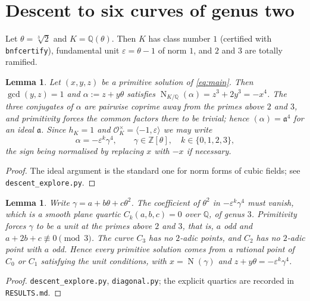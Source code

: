 \documentclass[11pt,reqno]{amsart}
\theoremstyle{plain}
\newtheorem{lemma}[theorem]{Lemma}
\theoremstyle{definition}
\newcommand{\Q}{\mathbb{Q}}
\newcommand{\Z}{\mathbb{Z}}
\newcommand{\Ocal}{\mathcal{O}}
\newcommand{\aaa}{\mathfrak{a}}
\DeclareMathOperator{\Nm}{N}
\numberwithin{equation}{section}
\begin{document}
\section{Descent to six curves of genus two}\label{sec:descent}

Let $\theta=\sqrt[3]{2}$ and $K=\Q(\theta)$. Then $K$ has class number $1$
(certified with \texttt{bnfcertify}), fundamental unit $\varepsilon=\theta-1$ of
norm $1$, and $2$ and $3$ are totally ramified.

\begin{lemma}\label{lem:A1}
Let $(x,y,z)$ be a primitive solution of \eqref{eq:main}. Then $\gcd(y,z)=1$ and
$\alpha:=z+y\theta$ satisfies $\Nm_{K/\Q}(\alpha)=z^{3}+2y^{3}=-x^{4}$. The
three conjugates of $\alpha$ are pairwise coprime away from the primes above
$2$ and $3$, and primitivity forces the common factors there to be trivial;
hence $(\alpha)=\aaa^{4}$ for an ideal $\aaa$. Since $h_{K}=1$ and
$\Ocal_{K}^{\times}=\langle-1,\varepsilon\rangle$ we may write
\[
  \alpha=-\varepsilon^{k}\gamma^{4},\qquad \gamma\in\Z[\theta],\quad k\in\{0,1,2,3\},
\]
the sign being normalised by replacing $x$ with $-x$ if necessary.
\end{lemma}

\begin{proof}
The ideal argument is the standard one for norm forms of cubic fields; see
\texttt{descent\_explore.py}.
\end{proof}

\begin{lemma}\label{lem:A2}
Write $\gamma=a+b\theta+c\theta^{2}$. The coefficient of $\theta^{2}$ in
$-\varepsilon^{k}\gamma^{4}$ must vanish, which is a smooth plane quartic
$C_{k}(a,b,c)=0$ over $\Q$, of genus $3$. Primitivity forces $\gamma$ to be a
unit at the primes above $2$ and $3$, that is, $a$ odd and
$a+2b+c\not\equiv0\pmod 3$. The curve $C_{3}$ has no $2$-adic points, and
$C_{2}$ has no $2$-adic point with $a$ odd. Hence every primitive solution comes
from a rational point of $C_{0}$ or $C_{1}$ satisfying the unit conditions, with
$x=\Nm(\gamma)$ and $z+y\theta=-\varepsilon^{k}\gamma^{4}$.
\end{lemma}

\begin{proof}
\texttt{descent\_explore.py}, \texttt{diagonal.py}; the explicit quartics are
recorded in \texttt{RESULTS.md}.
\end{proof}
\end{document}
